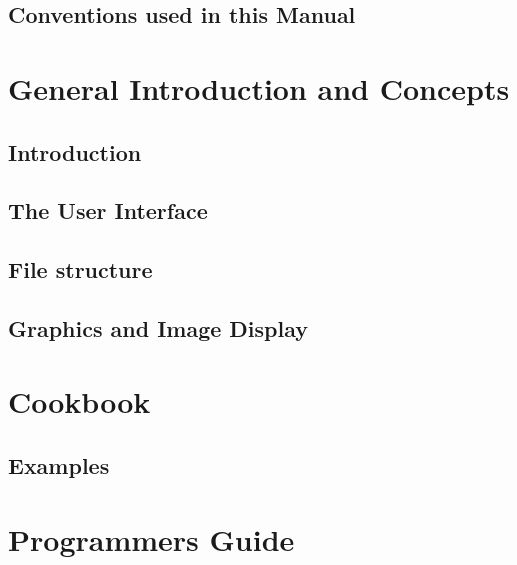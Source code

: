 \documentclass[headsepline,normalheadings]{book}
\begin{document}
\chapter*{Conventions used in this Manual}
 
\cleardoublepage
{}
\part{General Introduction and Concepts}
\chapter                {Introduction}
 
\cleardoublepage
\chapter                {The User Interface}
 
\cleardoublepage
\chapter                {File structure}

\cleardoublepage
\chapter                {Graphics and Image Display}
 
\part{Cookbook}
\cleardoublepage
\chapter                {Examples}
 	
\part{Programmers Guide}
\end{document}
